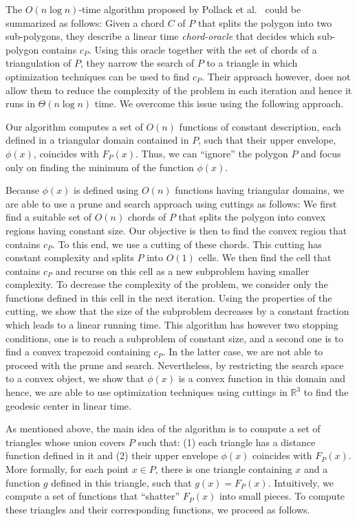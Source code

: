 \documentclass[a4paper,UKenglish]{lipics}
\newcommand{\F}[2]{\ensuremath{F_{\scriptscriptstyle #1}(#2)}}
\newcommand{\cp}{\ensuremath{c_P}}
\begin{document}
The $O(n \log n)$-time algorithm proposed by Pollack et al.~\cite{pollackComputingCenter} could be summarized as follows: 
Given a chord $C$ of $P$ that splits the polygon into two sub-polygons, they describe a linear time \emph{chord-oracle} that decides which sub-polygon contains $\cp$. Using this oracle together with the set of chords of a triangulation of $P$, they narrow the search of $P$ to a triangle in which optimization techniques can be used to find $\cp$.
Their approach however, does not allow them to reduce the complexity of the problem in each iteration and hence it runs in $\Theta(n\log n)$ time. We overcome this issue using the following approach.

Our algorithm computes a set of $O(n)$ functions of constant description, 
each defined in a triangular domain contained in $P$,
such that their upper envelope, $\phi(x)$, coincides with $\F{P}{x}$.
Thus, we can ``ignore'' the polygon $P$ and focus only on finding the minimum of the function $\phi(x)$.

Because $\phi(x)$ is defined using $O(n)$ functions having triangular domains, 
we are able to use a prune and search approach using cuttings as follows:
We first find a suitable set of $O(n)$ chords of $P$ that splits the polygon into convex regions having constant size.
Our objective is then to find the convex region that contains $\cp$. 
To this end, we use a cutting of these chords. This cutting has constant complexity and splits $P$ into $O(1)$ cells. 
We then find the cell that contains $\cp$ and recurse on this cell as a new subproblem having smaller complexity. 
To decrease the complexity of the problem, we consider only the functions defined in this cell in the next iteration. 
Using the properties of the cutting, we show that the size of the subproblem decreases by a constant fraction which leads to a linear running time. 
This algorithm has however two stopping conditions, 
one is to reach a subproblem of constant size, 
and a second one is to find a convex trapezoid containing $\cp$.
In the latter case, we are not able to proceed with the prune and search. 
Nevertheless, by restricting the search space to a convex object, 
we show that $\phi(x)$ is a convex function in this domain and hence, 
we are able to use optimization techniques using 
cuttings in $\mathbb{R}^3$ to find the geodesic center in linear time. 


As mentioned above, the main idea of the algorithm is to compute a set of triangles whose union covers $P$ such that:
(1) each triangle has a distance function defined in it and (2) their upper envelope $\phi(x)$ coincides with $\F{P}{x}$.
More formally, for each point $x\in P$, there is one triangle containing $x$ and a function $g$ defined in this triangle, such that $g(x) = \F{P}{x}$. Intuitively, we compute a set of functions that ``shatter'' $\F{P}{x}$ into small pieces. 
To compute these triangles and their corresponding functions, we proceed as follows.
\end{document}
